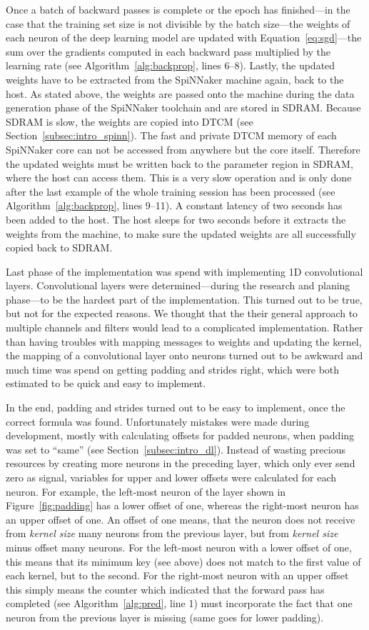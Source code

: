 \documentclass[]{article}
\begin{document}
Once a batch of backward passes is complete or the epoch has
finished---in the case that the training set size is not divisible by
the batch size---the weights of each neuron of the deep learning model
are updated with
Equation~\ref{eq:sgd}---the sum over the gradients computed in each
backward pass multiplied by the learning rate
(see Algorithm~\ref{alg:backprop}, lines 6--8).
Lastly, the updated weights have to be extracted from the SpiNNaker
machine again, back to the host.
As stated above, the weights are passed onto the machine during the
data generation phase of the SpiNNaker toolchain and are stored in
SDRAM.
Because SDRAM is slow, the weights are copied into DTCM (see
Section~\ref{subsec:intro_spinn}).
The fast and private DTCM memory of each SpiNNaker core can not be
accessed from anywhere but the core itself.
Therefore the updated weights must be written back to the parameter
region in SDRAM, where the host can access them.
This is a very slow operation and is only done after the last
example of the whole training session has been processed
(see Algorithm~\ref{alg:backprop}, lines 9--11).
A constant latency of two seconds has been added to the host.
The host sleeps for two seconds before it extracts the weights from
the machine, to make sure the updated weights are all successfully
copied back to SDRAM.

Last phase of the implementation was spend with implementing 1D
convolutional layers.
Convolutional layers were determined---during the research and planing
phase---to be the hardest part of the implementation.
This turned out to be true, but not for the expected reasons.
We thought that the their general approach to multiple channels and
filters would lead to a complicated implementation.
Rather than having troubles with mapping messages to weights and
updating the kernel, the mapping of a convolutional layer onto neurons
turned out to be awkward and much time was spend on getting padding
and strides right, which were both estimated to be quick and easy to
implement.

In the end, padding and strides turned out to be easy to implement,
once the correct formula was found.
Unfortunately mistakes were made during development, mostly with
calculating offsets for padded neurons, when padding was set to
``same'' (see Section~\ref{subsec:intro_dl}).
Instead of wasting precious resources by creating more neurons in
the preceding layer, which only ever send zero as signal, variables
for upper and lower offsets were calculated for each neuron.
For example, the left-most neuron of the layer shown in
Figure~\ref{fig:padding} has a lower offset of one, whereas the
right-most neuron has an upper offset of one.
An offset of one means, that the neuron does not receive
from \textit{kernel size} many neurons from the previous layer, but
from \textit{kernel size} minus offset many neurons.
For the left-most neuron with a lower offset of one, this means that
its minimum key (see above) does not match to the first
value of each kernel, but to the second.
For the right-most neuron with an upper offset this simply means the
counter which indicated that the forward pass has completed
(see Algorithm~\ref{alg:pred}, line 1) must incorporate the fact
that one neuron from the previous layer is missing (same goes for
lower padding).
\end{document}
